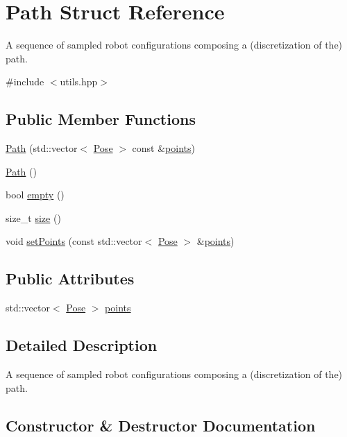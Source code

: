 \hypertarget{structPath}{}\section{Path Struct Reference}
\label{structPath}


A sequence of sampled robot configurations composing a (discretization of the) path.  




{\ttfamily \#include $<$utils.\+hpp$>$}

\subsection*{Public Member Functions}
\begin{DoxyCompactItemize}
\item 
\hyperlink{structPath_ad51cd6da6d625dccc562c98498d4675a}{Path} (std\+::vector$<$ \hyperlink{structPose}{Pose} $>$ const \&\hyperlink{structPath_a9847c298e904e1230b5706d22ed56c17}{points})
\item 
\hyperlink{structPath_af26cfab021ddf49af73da3b2beca85ac}{Path} ()
\item 
bool \hyperlink{structPath_aef5e0bd3594115a90bdbb9d8a0fb1cc5}{empty} ()
\item 
size\+\_\+t \hyperlink{structPath_ad6d1a267d775b7b9dcc5b6bfe1f8dd5a}{size} ()
\item 
void \hyperlink{structPath_a3e5e0ecbac2e7f869690ce9067815f5a}{set\+Points} (const std\+::vector$<$ \hyperlink{structPose}{Pose} $>$ \&\hyperlink{structPath_a9847c298e904e1230b5706d22ed56c17}{points})
\end{DoxyCompactItemize}
\subsection*{Public Attributes}
\begin{DoxyCompactItemize}
\item 
std\+::vector$<$ \hyperlink{structPose}{Pose} $>$ \hyperlink{structPath_a9847c298e904e1230b5706d22ed56c17}{points}
\end{DoxyCompactItemize}


\subsection{Detailed Description}
A sequence of sampled robot configurations composing a (discretization of the) path. 

\subsection{Constructor \& Destructor Documentation}
